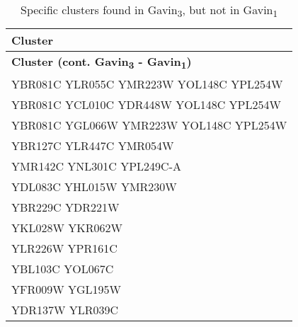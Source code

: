 \setlength{\extrarowheight}{2pt}
\renewcommand{\arraystretch}{1.2}
\begin{longtable}{| m{27em} |}
\caption{Specific clusters found in Gavin\textsubscript{3}, but not in Gavin\textsubscript{1}} \\
\hline
\textbf{Cluster} \\
\hline
\endfirsthead
\hline
\textbf{Cluster (cont. Gavin\textsubscript{3} - Gavin\textsubscript{1})} \\
\hline
\endhead
\hline
\endfoot
\hline
\endlastfoot
YBR081C YLR055C YMR223W YOL148C YPL254W \\
\hline
YBR081C YCL010C YDR448W YOL148C YPL254W \\
\hline
YBR081C YGL066W YMR223W YOL148C YPL254W \\
\hline
YBR127C YLR447C YMR054W \\
\hline
YMR142C YNL301C YPL249C-A \\
\hline
YDL083C YHL015W YMR230W \\
\hline
YBR229C YDR221W \\
\hline
YKL028W YKR062W \\
\hline
YLR226W YPR161C \\
\hline
YBL103C YOL067C \\
\hline
YFR009W YGL195W \\
\hline
YDR137W YLR039C \\
\hline
\end{longtable}
